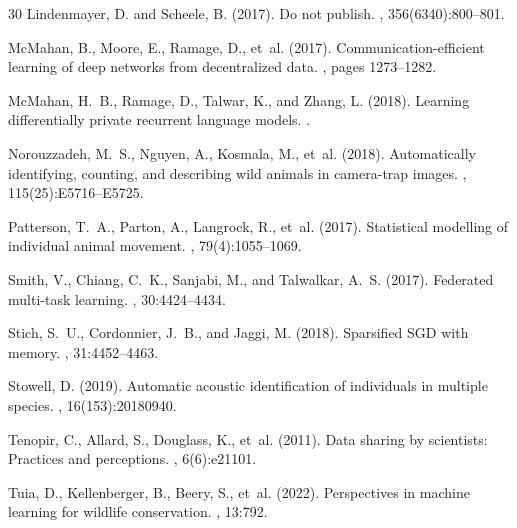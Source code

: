 \documentclass[11pt,a4paper]{article}
\begin{document}
\begin{thebibliography}{30}
Lindenmayer, D. and Scheele, B. (2017).
\newblock Do not publish.
, 356(6340):800--801.

McMahan, B., Moore, E., Ramage, D., et~al. (2017).
\newblock Communication-efficient learning of deep networks from decentralized data.
, pages 1273--1282.

McMahan, H.~B., Ramage, D., Talwar, K., and Zhang, L. (2018).
\newblock Learning differentially private recurrent language models.
.

Norouzzadeh, M.~S., Nguyen, A., Kosmala, M., et~al. (2018).
\newblock Automatically identifying, counting, and describing wild animals in camera-trap images.
, 115(25):E5716--E5725.

Patterson, T.~A., Parton, A., Langrock, R., et~al. (2017).
\newblock Statistical modelling of individual animal movement.
, 79(4):1055--1069.

Smith, V., Chiang, C.~K., Sanjabi, M., and Talwalkar, A.~S. (2017).
\newblock Federated multi-task learning.
, 30:4424--4434.

Stich, S.~U., Cordonnier, J.~B., and Jaggi, M. (2018).
\newblock Sparsified SGD with memory.
, 31:4452--4463.

Stowell, D. (2019).
\newblock Automatic acoustic identification of individuals in multiple species.
, 16(153):20180940.

Tenopir, C., Allard, S., Douglass, K., et~al. (2011).
\newblock Data sharing by scientists: Practices and perceptions.
, 6(6):e21101.

Tuia, D., Kellenberger, B., Beery, S., et~al. (2022).
\newblock Perspectives in machine learning for wildlife conservation.
, 13:792.


\end{thebibliography}
\end{document}
